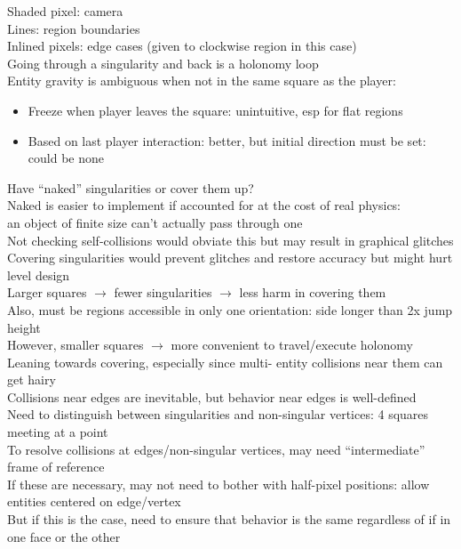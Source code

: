 \documentclass{article}
\begin{document}
Shaded pixel: camera \\
Lines: region boundaries \\
Inlined pixels: edge cases (given to clockwise region in this case) \\
Going through a singularity and back is a holonomy loop \\
Entity gravity is ambiguous when not in the same square as the player:
\begin{itemize}
\item
  Freeze when player leaves the square: unintuitive, esp for flat regions
\item
  Based on last player interaction: better, but initial direction must be set:
  could be none
\end{itemize}
Have ``naked'' singularities or cover them up? \\
Naked is easier to implement if accounted for
at the cost of real physics: \\
an object of finite size can't actually pass through one \\
Not checking self-collisions would obviate this
but may result in graphical glitches \\
Covering singularities would prevent glitches and restore accuracy
but might hurt level design \\
Larger squares $\rightarrow$ fewer singularities $\rightarrow$ less harm in covering them \\
Also, must be regions  accessible in only one orientation:
side longer than 2x jump height \\
However, smaller squares $\rightarrow$ more convenient to travel/execute holonomy \\
Leaning towards covering,
especially since multi- entity collisions near them can get hairy \\
Collisions near edges are inevitable,
but behavior near edges is well-defined \\
Need to distinguish between singularities and non-singular vertices:
4 squares meeting at a point \\
To resolve collisions at edges/non-singular vertices,
may need ``intermediate'' frame of reference \\
If these are necessary, may not need to bother with half-pixel positions:
allow entities centered on edge/vertex \\
But if this is the case, need to ensure that behavior is the same
regardless of if in one face or the other
\end{document}
